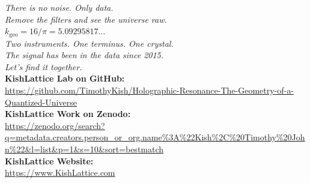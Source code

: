 \documentclass[11pt, letterpaper, openany]{book}
\begin{document}
\vfill
\begin{center}
\large
\textit{There is no noise. Only data.}\\
\textit{Remove the filters and see the universe raw.}\\[1em]
\normalsize
$k_\text{geo} = 16/\pi = 5.09295817\ldots$\\[0.5em]
\textit{Two instruments. One terminus. One crystal.}\\[0.5em]
\textit{The signal has been in the data since 2015.}\\
\textit{Let's find it together.}\\[1em]

\small
\textbf{KishLattice Lab on GitHub:}\\
\url{https://github.com/TimothyKish/Holographic-Resonance-The-Geometry-of-a-Quantized-Universe}\\[0.5em]
\textbf{KishLattice Work on Zenodo:}\\
\url{https://zenodo.org/search?q=metadata.creators.person_or_org.name%3A%22Kish%2C%20Timothy%20John%22&l=list&p=1&s=10&sort=bestmatch}\\[0.5em]
\textbf{KishLattice Website:}\\[0.5em]
\url{https://www.KishLattice.com}
\end{center}
\end{document}
